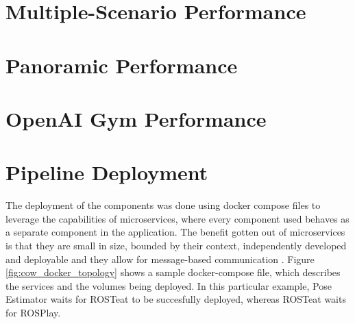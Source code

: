 \section{Multiple-Scenario Performance}


\section{Panoramic Performance}


\section{OpenAI Gym Performance}








\newpage
\section{Pipeline Deployment}\label{chap:4:deployment}
The deployment of the components was done using docker compose files to leverage the capabilities of microservices, where every component used behaves as a separate component in the application. The benefit gotten out of microservices is that they are small in size, bounded by their context, independently developed and deployable and they allow for message-based communication%
. 
Figure \ref{fig:cow_docker_topology} shows a sample docker-compose file, which describes the services and the volumes being deployed. In this particular example, Pose Estimator waits for ROSTeat to be succesfully deployed, whereas ROSTeat waits for ROSPlay.

